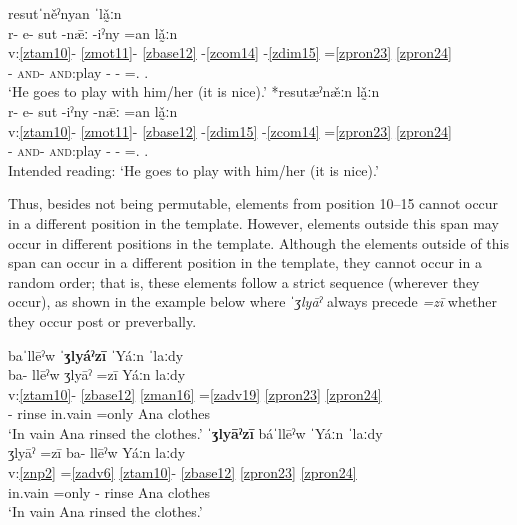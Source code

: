 \documentclass[output=paper]{langscibook}
\begin{document}
\ea\label{ex:key:zap:30}
{resutˈněˀnyan   ˈlǎ̰ːn}\\
\glll r- e- sut -nǣː -iˀny =an lǎ̰ːn\\
v:\ref{ztam10}- \ref{zmot11}- \ref{zbase12} {}-\ref{zcom14} -\ref{zdim15} =\ref{zpron23} \ref{zpron24} \\
\Hab{}- \textsc{and}- \textsc{and}:play -\textbf{\Com{}} -\textbf{\Dim{}} =\Third\Sg{}.\Inf{} \Third\Sg{}.\Inf{}\\
\glt `He goes to play with him/her (it is nice).'
\ex\label{ex:key:zap:31}
{*resutæˀn\v{æ}ːn lǎ̰ːn}\\
\glll r{}- e- sut -iˀny {}-nǣː =an lǎ̰ːn\\
v:\ref{ztam10}- \ref{zmot11}- \ref{zbase12} {}-\ref{zdim15} -\ref{zcom14} =\ref{zpron23} \ref{zpron24} \\
\Hab{}- \textsc{and}- \textsc{and}:play -\textbf{\Dim{} } -\textbf{\Com{} } =\Third\Sg{}.\Inf{} \Third\Sg{}.\Inf{}\\
\glt Intended reading: `He goes to play with him/her (it is nice).'
\z

Thus, besides not being permutable, elements from position 10–15 cannot occur in a different position in the template. However, elements outside this span may occur in different positions in the template. Although the elements outside of this span can occur in a different position in the template, they cannot occur in a random order; that is, these elements follow a strict sequence (wherever they occur), as shown in the example below where \textit{ˈʒlyāˀ} always precede \textit{=zī} whether they occur post or preverbally.

\ea\label{ex:key:zap:32}
{baˈllēˀw ˈ\textbf{ʒlyáˀzī}   ˈYáːn  ˈlaːdy}\\
\glll ba- llēˀw ʒlyāˀ =zī Yáːn laːdy\\
v:\ref{ztam10}- \ref{zbase12} \ref{zman16} =\ref{zadv19} \ref{zpron23} \ref{zpron24} \\
\Compl{}- rinse in.vain =only Ana clothes\\
\glt `In vain Ana rinsed the clothes.'
\ex\label{ex:key:zap:33}
{ˈ\textbf{ʒlyāˀzī} báˈllēˀw   ˈYáːn ˈlaːdy}\\
\glll ʒlyāˀ =zī ba- llēˀw Yáːn laːdy\\
v:\ref{znp2} =\ref{zadv6} \ref{ztam10}{}- \ref{zbase12} \ref{zpron23} \ref{zpron24} \\ 
in.vain =only \Compl{}- rinse Ana clothes\\
\glt `In vain Ana rinsed the clothes.' 
\z
\end{document}
